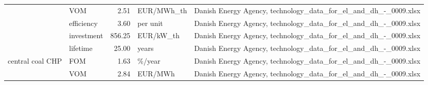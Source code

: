\begin{longtable}{p{5cm}p{3cm}rp{3cm}p{11cm}}
                      & VOM &           2.51 &                        EUR/MWh\_th &                                                                                                                                                                                                                                                                      Danish Energy Agency, technology\_data\_for\_el\_and\_dh\_-\_0009.xlsx \\
                      & efficiency &           3.60 &                          per unit &                                                                                                                                                                                                                                                                      Danish Energy Agency, technology\_data\_for\_el\_and\_dh\_-\_0009.xlsx \\
                      & investment &         856.25 &                         EUR/kW\_th &                                                                                                                                                                                                                                                                      Danish Energy Agency, technology\_data\_for\_el\_and\_dh\_-\_0009.xlsx \\
                      & lifetime &          25.00 &                             years &                                                                                                                                                                                                                                                                      Danish Energy Agency, technology\_data\_for\_el\_and\_dh\_-\_0009.xlsx \\
central coal CHP & FOM &           1.63 &                            \%/year &                                                                                                                                                                                                                                                                      Danish Energy Agency, technology\_data\_for\_el\_and\_dh\_-\_0009.xlsx \\
                      & VOM &           2.84 &                           EUR/MWh &                                                                                                                                                                                                                                                                      Danish Energy Agency, technology\_data\_for\_el\_and\_dh\_-\_0009.xlsx \\

\end{longtable}
